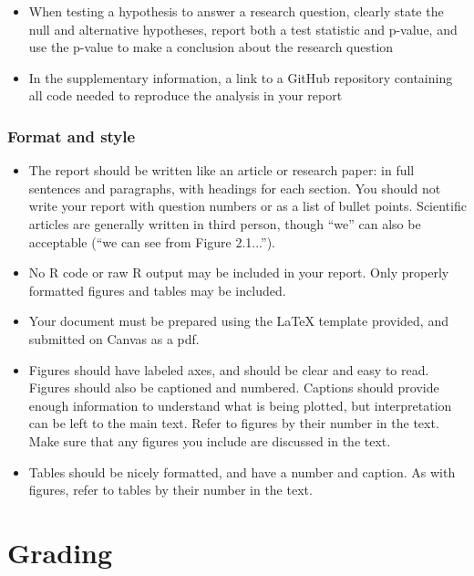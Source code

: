\documentclass[11pt]{article}
\begin{document}
\begin{itemize}
\item When testing a hypothesis to answer a research question, clearly state the null and alternative hypotheses, report both a test statistic and p-value, and use the p-value to make a conclusion about the research question

\item In the supplementary information, a link to a GitHub repository containing all code needed to reproduce the analysis in your report
\end{itemize}

\subsubsection*{Format and style}

\begin{itemize}
\item The report should be written like an article or research paper: in full sentences and paragraphs, with headings for each section. You should not write your report with question numbers or as a list of bullet points. Scientific articles are generally written in third person, though ``we'' can also be acceptable (``we can see from Figure 2.1...'').

\item No R code or raw R output may be included in your report. Only properly formatted figures and tables may be included.

\item Your document must be prepared using the LaTeX template provided, and submitted on Canvas as a pdf.

\item Figures should have labeled axes, and should be clear and easy to read. Figures should also be captioned and numbered. Captions should provide enough information to understand what is being plotted, but interpretation can be left to the main text. Refer to figures by their number in the text. Make sure that any figures you include are discussed in the text.

\item Tables should be nicely formatted, and have a number and caption. As with figures, refer to tables by their number in the text.
\end{itemize}

\section*{Grading}
\end{document}
